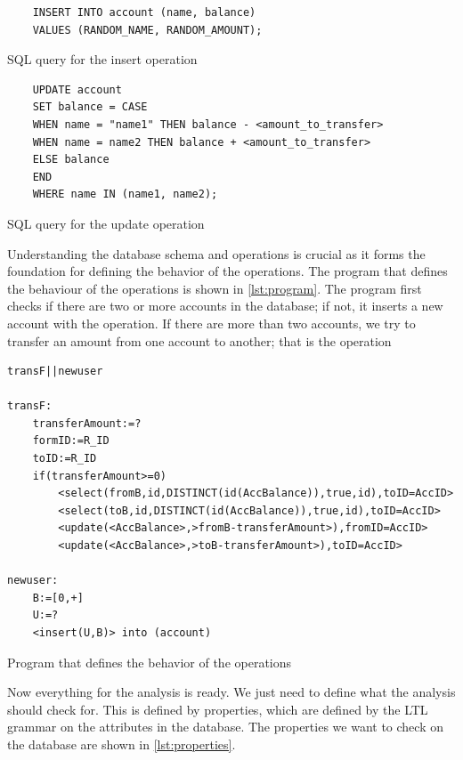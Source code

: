 \begin{listing}[htb!]
\begin{verbatim}
    INSERT INTO account (name, balance)
    VALUES (RANDOM_NAME, RANDOM_AMOUNT);
\end{verbatim}
\label{lst:sql-queries}
\caption{SQL query for the insert operation}
\end{listing}


\begin{listing}[htb!]
\begin{verbatim}
    UPDATE account
    SET balance = CASE
    WHEN name = "name1" THEN balance - <amount_to_transfer>
    WHEN name = name2 THEN balance + <amount_to_transfer>
    ELSE balance
    END
    WHERE name IN (name1, name2);
\end{verbatim}
\caption{SQL query for the update operation}
\label{lst:sql-queries2}
\end{listing}

Understanding the database schema and operations is crucial as it forms the foundation for defining the behavior of the operations.
The program that defines the behaviour of the operations is shown in \autoref{lst:program}.
The program first checks if there are two or more accounts in the database; if not, it inserts a new account with the  operation.
If there are more than two accounts, we try to transfer an amount from one account to another; that is the  operation

\begin{listing}[htb!]
\begin{verbatim}
transF||newuser

transF:
    transferAmount:=?
    formID:=R_ID
    toID:=R_ID
    if(transferAmount>=0)
        <select(fromB,id,DISTINCT(id(AccBalance)),true,id),toID=AccID>
        <select(toB,id,DISTINCT(id(AccBalance)),true,id),toID=AccID>
        <update(<AccBalance>,>fromB-transferAmount>),fromID=AccID>
        <update(<AccBalance>,>toB-transferAmount>),toID=AccID>

newuser:
    B:=[0,+]
    U:=?
    <insert(U,B)> into (account)
\end{verbatim}
\caption{Program that defines the behavior of the operations}
\label{lst:program}
\end{listing}


Now everything for the analysis is ready.
We just need to define what the analysis should check for.
This is defined by properties, which are defined by the LTL grammar on the attributes in the database.
The properties we want to check on the database are shown in \autoref{lst:properties}.

